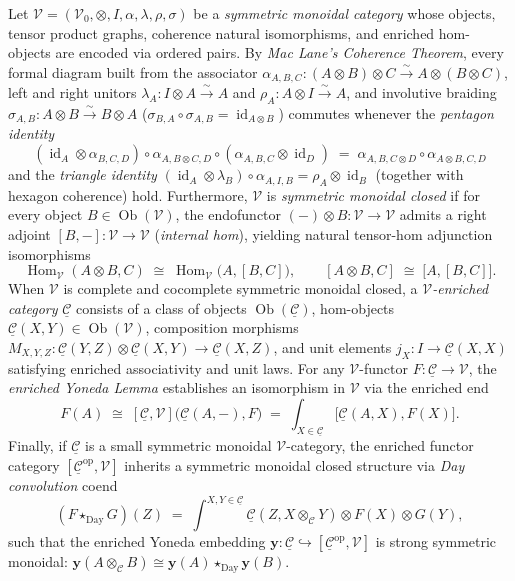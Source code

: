 Let $\mathcal{V} = (\mathcal{V}_0, \otimes, I, \alpha, \lambda, \rho, \sigma)$ be a \emph{symmetric monoidal category} whose objects, tensor product graphs, coherence natural isomorphisms, and enriched hom-objects are encoded via ordered pairs. By \emph{Mac Lane's Coherence Theorem}, every formal diagram built from the associator $\alpha_{A,B,C}\colon (A \otimes B) \otimes C \xrightarrow{\sim} A \otimes (B \otimes C)$, left and right unitors $\lambda_A\colon I \otimes A \xrightarrow{\sim} A$ and $\rho_A\colon A \otimes I \xrightarrow{\sim} A$, and involutive braiding $\sigma_{A,B}\colon A \otimes B \xrightarrow{\sim} B \otimes A$ ($\sigma_{B,A} \circ \sigma_{A,B} = \operatorname{id}_{A \otimes B}$) commutes whenever the \emph{pentagon identity}
\[
(\operatorname{id}_A \otimes \alpha_{B,C,D}) \circ \alpha_{A,B \otimes C,D} \circ (\alpha_{A,B,C} \otimes \operatorname{id}_D) \;=\; \alpha_{A,B,C \otimes D} \circ \alpha_{A \otimes B,C,D}
\]
and the \emph{triangle identity} $(\operatorname{id}_A \otimes \lambda_B) \circ \alpha_{A,I,B} = \rho_A \otimes \operatorname{id}_B$ (together with hexagon coherence) hold. Furthermore, $\mathcal{V}$ is \emph{symmetric monoidal closed} if for every object $B \in \operatorname{Ob}(\mathcal{V})$, the endofunctor $(-) \otimes B\colon \mathcal{V} \to \mathcal{V}$ admits a right adjoint $[B, -]\colon \mathcal{V} \to \mathcal{V}$ (\emph{internal hom}), yielding natural tensor-hom adjunction isomorphisms
\[
\operatorname{Hom}_{\mathcal{V}}(A \otimes B, C) \;\cong\; \operatorname{Hom}_{\mathcal{V}}\bigl(A, [B, C]\bigr), \qquad [A \otimes B, C] \;\cong\; \bigl[A, [B, C]\bigr].
\]
When $\mathcal{V}$ is complete and cocomplete symmetric monoidal closed, a \emph{$\mathcal{V}$-enriched category} $\underline{\mathcal{C}}$ consists of a class of objects $\operatorname{Ob}(\underline{\mathcal{C}})$, hom-objects $\underline{\mathcal{C}}(X, Y) \in \operatorname{Ob}(\mathcal{V})$, composition morphisms $M_{X,Y,Z}\colon \underline{\mathcal{C}}(Y, Z) \otimes \underline{\mathcal{C}}(X, Y) \to \underline{\mathcal{C}}(X, Z)$, and unit elements $j_X\colon I \to \underline{\mathcal{C}}(X, X)$ satisfying enriched associativity and unit laws. For any $\mathcal{V}$-functor $F\colon \underline{\mathcal{C}} \to \mathcal{V}$, the \emph{enriched Yoneda Lemma} establishes an isomorphism in $\mathcal{V}$ via the enriched end
\[
F(A) \;\cong\; [\underline{\mathcal{C}}, \mathcal{V}]\bigl(\underline{\mathcal{C}}(A, -), F\bigr) \;=\; \int_{X \in \underline{\mathcal{C}}} \bigl[\underline{\mathcal{C}}(A, X), F(X)\bigr].
\]
Finally, if $\underline{\mathcal{C}}$ is a small symmetric monoidal $\mathcal{V}$-category, the enriched functor category $[\underline{\mathcal{C}}^{\mathrm{op}}, \mathcal{V}]$ inherits a symmetric monoidal closed structure via \emph{Day convolution} coend
\[
(F \star_{\mathrm{Day}} G)(Z) \;=\; \int^{X, Y \in \underline{\mathcal{C}}} \underline{\mathcal{C}}(Z, X \otimes_{\mathcal{C}} Y) \otimes F(X) \otimes G(Y),
\]
such that the enriched Yoneda embedding $\mathbf{y}\colon \underline{\mathcal{C}} \hookrightarrow [\underline{\mathcal{C}}^{\mathrm{op}}, \mathcal{V}]$ is strong symmetric monoidal: $\mathbf{y}(A \otimes_{\mathcal{C}} B) \cong \mathbf{y}(A) \star_{\mathrm{Day}} \mathbf{y}(B)$.

